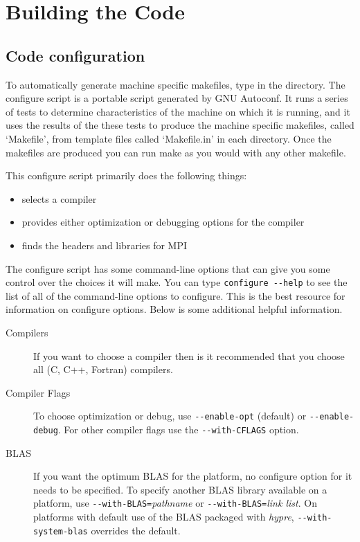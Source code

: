 \chapter{Building the Code}
\section{Code configuration}

To automatically generate machine specific makefiles, type
 in the  directory.  The configure
script is a portable script generated by GNU Autoconf.  It runs a
series of tests to determine characteristics of the machine on which
it is running, and it uses the results of the these tests to produce
the machine specific makefiles, called `Makefile', from template files
called `Makefile.in' in each directory.  Once the makefiles are
produced you can run make as you would with any other makefile.

This configure script primarily does the following things:
\begin{itemize}
\item selects a compiler
\item provides either optimization or debugging options for the compiler
\item finds the headers and libraries for MPI
\end{itemize}

The configure script has some command-line options that can give you
some control over the choices it will make.  You can type
\verb+configure --help+
to see the list of all of the command-line options to configure. This is
the best resource for information on configure options.  Below is some
additional helpful information.


\begin{description}

\item[Compilers] If you want to choose a compiler then is it recommended
that you choose all (C, C++, Fortran) compilers.

\item[Compiler Flags] To choose optimization or debug, use
\verb+--enable-opt+ (default) or \verb+--enable-debug+.
For other compiler flags use the \verb+--with-CFLAGS+ option.  

\item[BLAS] If you want the optimum BLAS for the platform,
no configure option for it needs to be specified.
To specify another BLAS library available on a
platform, use \verb+--with-BLAS=+{\itshape pathname} or
\verb+--with-BLAS=+{\itshape link list}.  On platforms with
default use of the BLAS packaged with {\slshape hypre},
\verb+--with-system-blas+ overrides the default.

\end{description}

